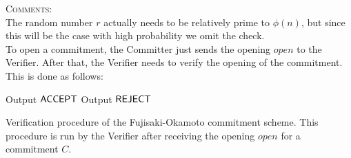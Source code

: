 \textsc{Comments}:\\
The random number $r$ actually needs to be relatively prime to $\phi(n)$, but since this will be the case with high probability we omit the check.
\\

To open a commitment, the Committer just sends the opening $open$ to the Verifier. After that, the Verifier needs to verify the opening of the commitment. This is done as follows:
\\

\begin{algorithm}[H]\label{verifyFO}
\dontprintsemicolon

\BlankLine

 \;
\Indp
    {Output $\mathsf{ACCEPT}$ \;}
  \Else
    {Output $\mathsf{REJECT}$ \;}
\Indm

\caption{Verification procedure of the Fujisaki-Okamoto commitment scheme. This procedure is run by the Verifier after receiving the opening $open$ for a commitment $C$.}
\end{algorithm}

